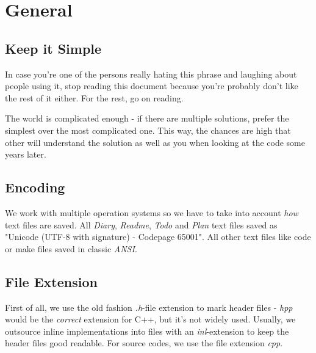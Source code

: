 \chapter{General}




\section{Keep it Simple}
In case you're one of the persons really hating this phrase and laughing about people using it, stop reading this document because you're probably don't like the rest of it either. For the rest, go on reading.

The world is complicated enough - if there are multiple solutions, prefer the simplest over the most complicated one. This way, the chances are high that other will understand the solution as well as you when looking at the code some years later.




\section{Encoding}
We work with multiple operation systems so we have to take into account \emph{how} text files are saved. All \emph{Diary}, \emph{Readme}, \emph{Todo} and \emph{Plan} text files saved as "Unicode (UTF-8 with signature) - Codepage 65001". All other text files like code or make files saved in classic \emph{ANSI}.




\section{File Extension}
\label{General:FileExtension}
First of all, we use the old fashion \emph{.h}-file extension to mark header files - \emph{hpp} would be the \emph{correct} extension for C++, but it's not widely used. Usually, we outsource inline implementations into files with an \emph{inl}-extension to keep the header files good readable. For source codes, we use the file extension \emph{cpp}.




